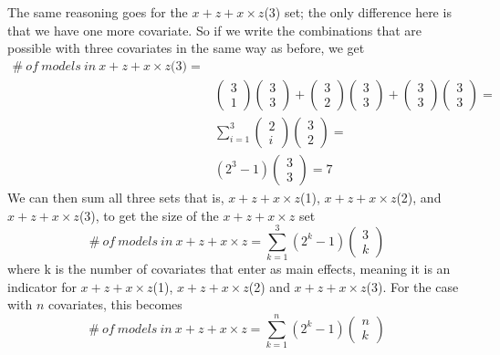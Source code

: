 The same reasoning goes for the $x + z + x \times z$(3) set; the only difference here is that we have one more covariate. So if we write the combinations that are possible with three covariates in the same way as before, we get
\begin{equation*}
\begin{aligned}
\#\ of\ models\ in\ x + z + x \times z\textit{(3)}=\\
&\left( \begin{array}{c}
3 \\ 
1 \end{array}
\right)\left( \begin{array}{c}
3 \\ 
3 \end{array}
\right)+\left( \begin{array}{c}
3 \\ 
2 \end{array}
\right)\left( \begin{array}{c}
3 \\ 
3 \end{array}
\right)+\left( \begin{array}{c}
3 \\ 
3 \end{array}
\right)\left( \begin{array}{c}
3 \\ 
3 \end{array}
\right)= \\
&\sum^3_{i=1}{\left( \begin{array}{c}
2 \\ 
i \end{array}
\right)}\left( \begin{array}{c}
3 \\ 
2 \end{array}
\right)= \\
&\left(2^3-1\right)\left( \begin{array}{c}
3 \\ 
3 \end{array}
\right)=7
\end{aligned}
\end{equation*}
We can then sum all three sets that is, $x + z + x \times z$(1), $x + z + x \times z$(2), and $x + z + x \times z$(3), to get the size of the $x + z + x \times z$ set
\[\#\ of\ models\ in\ x + z + x \times z=\sum^3_{k=1}{(2^k-1)\left( \begin{array}{c}
3 \\ 
k \end{array}
\right)}\]where k is the number of covariates that enter as main effects, meaning it is an indicator for $x + z + x \times z$(1), $x + z + x \times z$(2) and $x + z + x \times z$(3). For the case with $n$ covariates, this becomes
\[\#\ of\ models\ in\ x + z + x \times z=\sum^n_{k=1}{(2^k-1)\left( \begin{array}{c}
n \\ 
k \end{array}
\right)}\] 
